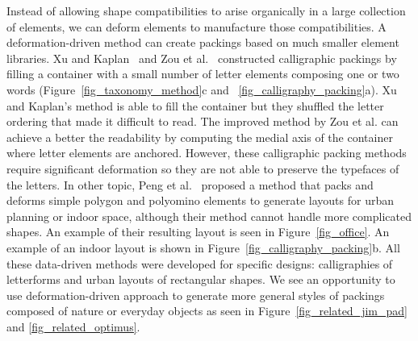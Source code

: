 \nnewtext
{
Instead of allowing shape compatibilities to arise organically in a large collection of elements, 
we can deform elements to manufacture those compatibilities.
A deformation-driven method can create packings based on much smaller element libraries.
Xu and Kaplan~\cite{Xu2007} and Zou et al.~\cite{Zou2016} constructed calligraphic packings by filling a container with a small
number of letter elements composing one or two words (Figure~\ref{fig_taxonomy_method}c and ~\ref{fig_calligraphy_packing}a). 
Xu and Kaplan's method is able to fill the container but they shuffled the letter ordering that made it difficult to read.
The improved method by Zou et al. can achieve a better the readability by computing
the medial axis of the container where letter elements are anchored.
However, these calligraphic packing methods require significant deformation 
so they are not able to preserve the typefaces of the letters.
In other topic, Peng et al.~\cite{Peng2014} proposed a method that packs and deforms
simple polygon and polyomino elements to generate layouts for urban planning or indoor space, 
although their method cannot handle more complicated shapes. 
An example of their resulting layout is seen in Figure~\ref{fig_office}.
An example of an indoor layout is shown in Figure~\ref{fig_calligraphy_packing}b.
All these data-driven methods were developed for specific designs: calligraphies of letterforms and urban layouts of rectangular shapes.
We see an opportunity to use deformation-driven approach to generate more general styles of packings composed
of nature or everyday objects as seen in Figure~\ref{fig_related_jim_pad} and \ref{fig_related_optimus}.
}


